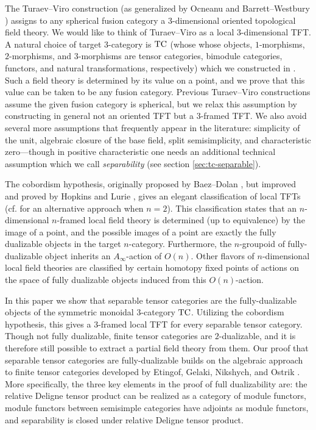 \documentclass{amsart}
\begin{document}
The Turaev--Viro \cite{MR1191386, MR1292673} construction (as generalized by Ocneanu \cite{MR1317353} and Barrett--Westbury \cite{MR1686423}) assigns to any spherical fusion category a 3-dimensional oriented topological field theory.   We would like to think of Turaev--Viro as a local $3$-dimensional TFT.  A natural choice of target $3$-category is $\mathrm{TC}$ (whose whose objects, $1$-morphisms, $2$-morphisms, and $3$-morphisms are tensor categories, bimodule categories, functors, and natural transformations, respectively) which we constructed in \cite{3TC}.  Such a field theory is determined by its value on a point, and we prove that this value can be taken to be any fusion category.  Previous Turaev--Viro constructions assume the given fusion category is spherical, but we relax this assumption by constructing in general not an oriented TFT but a $3$-framed TFT.   We also avoid several more assumptions that frequently appear in the literature: simplicity of the unit, algebraic closure of the base field, split semisimplicity, and characteristic zero---though in positive characteristic one needs an additional technical assumption which we call {\em separability} (see section \ref{sec:tc-separable}).

The cobordism hypothesis, originally proposed by Baez--Dolan \cite{MR1355899}, but improved and proved by Hopkins and Lurie \cite{lurie-ch}, gives an elegant classification of local TFTs (cf. \cite{schommer-pries-thesis} for an alternative approach when $n=2$).  This classification states that an $n$-dimensional $n$-framed local field theory is determined (up to equivalence) by the image of a point, and the possible images of a point are exactly the fully dualizable objects in the target $n$-category.  Furthermore, the $n$-groupoid of fully-dualizable object inherits an $A_\infty$-action of $O(n)$. Other flavors of $n$-dimensional local field theories are classified by certain homotopy fixed points of actions %
on the space of fully dualizable objects induced from this $O(n)$-action.  

In this paper we show that separable tensor categories are the fully-dualizable objects of the symmetric monoidal 3-category $\mathrm{TC}$. Utilizing the cobordism hypothesis, this gives a 3-framed local TFT for every separable tensor category. Though not fully dualizable, finite tensor categories are $2$-dualizable, and it is therefore still possible to extract a partial field theory from them.  Our proof that separable tensor categories are fully-dualizable builds on the algebraic approach to finite tensor categories developed by Etingof, Gelaki, Nikshych, and Ostrik \cite{EGNO, EO-ftc, MR2183279, MR2097289}.  More specifically, the three key elements in the proof of full dualizability are: the relative Deligne tensor product can be realized as a category of module functors, module functors between semisimple categories have adjoints as module functors, and separability is closed under relative Deligne tensor product.
\end{document}
